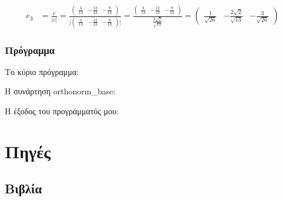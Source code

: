 \documentclass[12pt, fleqn, leqno]{extreport}
\begin{document}
\begin{equation}
    \begin{split}
        e_{3} &= \frac{c}{\vert c \vert} =
        \frac{
            \begin{pmatrix}
                \frac{3}{13} & -\frac{12}{13} & -\frac{9}{13}
            \end{pmatrix}
        }{
            \vert
            \begin{pmatrix}
                \frac{3}{13} & -\frac{12}{13} & -\frac{9}{13}
            \end{pmatrix}
            \vert
        } =
        \frac{
            \begin{pmatrix}
                \frac{3}{13} & -\frac{12}{13} & -\frac{9}{13}
            \end{pmatrix}
        }{
            \frac{3\sqrt{2}}{\sqrt{13}}
        } =
        \begin{pmatrix}
            \frac{1}{\sqrt{26}} & -\frac{2\sqrt{2}}{\sqrt{13}} & -\frac{3}{\sqrt{26}}
        \end{pmatrix}
    \end{split}
\end{equation}

\newpage
\subsection{Πρόγραμμα}

Το κύριο πρόγραμμα:


Η συνάρτηση orthonorm\_base:


Η έξοδος του προγράμματός μου:



\chapter{Πηγές}
\newpage

\section{Βιβλία}
\end{document}
